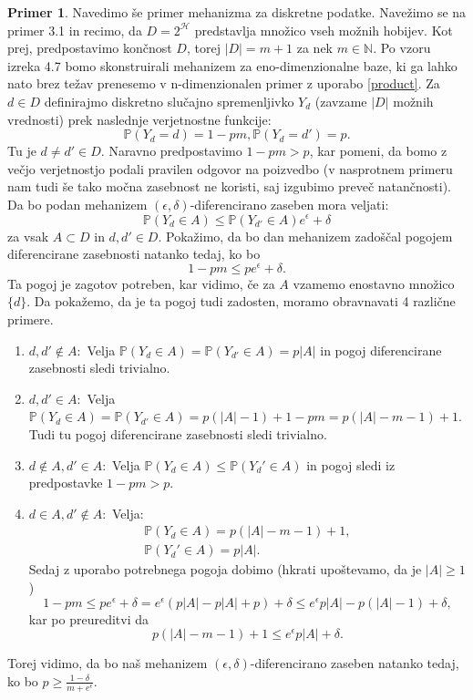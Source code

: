 \documentclass[12pt,a4paper]{amsart}
\theoremstyle{definition} %
\newtheorem{primer}[definicija]{Primer}
\theoremstyle{plain} %
\begin{document}
\begin{primer}
Navedimo še primer mehanizma za diskretne podatke. Navežimo se na primer 3.1 in recimo, da $D=2^{\mathcal{H}}$ predstavlja množico vseh možnih hobijev. Kot prej, predpostavimo končnost $D$, torej $|D| = m + 1$ za nek $m \in \mathbb{N}$. Po vzoru izreka 4.7 bomo skonstruirali mehanizem za eno-dimenzionalne baze, ki ga lahko nato brez težav prenesemo v n-dimenzionalen primer z uporabo \eqref{product}.
\newline
\newline
Za $d \in D$ definirajmo diskretno slučajno spremenljivko $Y_d$ (zavzame $|D|$ možnih vrednosti) prek naslednje verjetnostne funkcije:
$$\mathbb{P}(Y_d=d) = 1 - pm, \mathbb{P}(Y_d=d') = p.$$
Tu je $d \neq d' \in D$. Naravno predpostavimo $1 - pm > p$, kar pomeni, da bomo z večjo verjetnostjo podali pravilen odgovor na poizvedbo (v nasprotnem primeru nam tudi še tako močna zasebnost ne koristi, saj izgubimo preveč natančnosti).
\newline
\newline
Da bo podan mehanizem $(\epsilon, \delta)$-diferencirano zaseben mora veljati:
\begin{equation}
\mathbb{P}(Y_d \in A) \leq \mathbb{P}(Y_{d'} \in A)e^{\epsilon} + \delta
\end{equation}
za vsak $A \subset D$ in $d, d' \in D$.
\newline
\newline
Pokažimo, da bo dan mehanizem zadoščal pogojem diferencirane zasebnosti natanko tedaj, ko bo $$1 - pm \leq pe^{\epsilon} + \delta.$$ Ta pogoj je zagotov potreben, kar vidimo, če za $A$ vzamemo enostavno množico $\{d\}$. Da pokažemo, da je ta pogoj tudi zadosten, moramo obravnavati 4 različne primere.
\begin{enumerate}
\item $d,d' \notin A: $ Velja $\mathbb{P}(Y_d \in A) = \mathbb{P}(Y_{d'} \in A)= p|A|$ in pogoj diferencirane zasebnosti sledi trivialno.
\item $d,d' \in A: $ Velja $\mathbb{P}(Y_d \in A) = \mathbb{P}(Y_{d'} \in A) = p(|A| - 1) + 1 - pm=p(|A| -m -1) + 1$. Tudi tu pogoj diferencirane zasebnosti sledi trivialno.
\item $d \notin A,d' \in A: $ Velja $\mathbb{P}(Y_d \in A) \leq \mathbb{P}(Y_d' \in A)$ in pogoj sledi iz predpostavke $1 - pm > p$.
\item  $d \in A, d' \notin A: $ Velja:
\begin{equation*}
\begin{split}
\mathbb{P}(Y_d \in A) = p(|A| -m -1) + 1, \\
\mathbb{P}(Y_d' \in A) = p|A|.
\end{split}
\end{equation*}
Sedaj z uporabo potrebnega pogoja dobimo (hkrati upoštevamo, da je $|A| \geq 1$)
$$1-pm\leq pe^{\epsilon} + \delta = e^{\epsilon}(p|A|-p|A|+p)+\delta \leq e^{\epsilon}p|A|-p(|A|-1)+\delta,$$
kar po preureditvi da 
$$p(|A| -m -1) + 1 \leq e^{\epsilon}p|A| + \delta.$$
\end{enumerate}
Torej vidimo, da bo naš mehanizem $(\epsilon, \delta)$-diferencirano zaseben natanko tedaj, ko bo $p \geq \frac{1-\delta}{m+e^{\epsilon}}$.


\end{primer}
\end{document}
